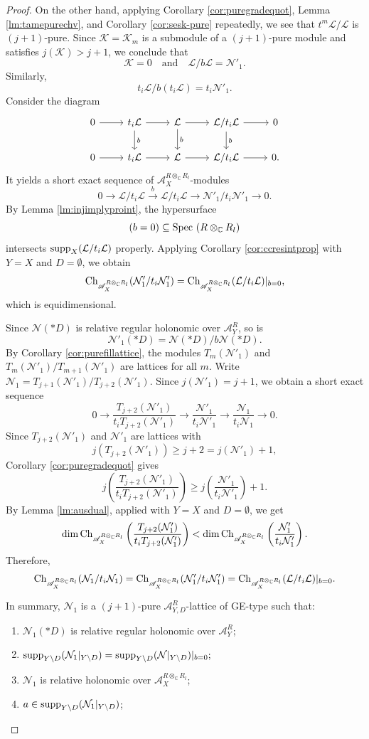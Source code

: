 \documentclass{amsart}
\theoremstyle{plain}
\numberwithin{theorem}{section}
\theoremstyle{definition}
\theoremstyle{remark}
\theoremstyle{definition}
\newcommand{\C}{\mathbb{C}} %
\newcommand{\cK}{\mathcal{K}}
\newcommand{\cL}{\mathcal{L}}
\newcommand{\cN}{\mathcal{N}}
\newcommand{\sA}{\mathscr{A}}
\newcommand{\Spec}{\textup{Spec }}
\newcommand{\supp}{\textup{supp}}
\newcommand{\Ch}{\textup{Ch}}
\begin{document}
\begin{proof}
On the other hand, applying Corollary \ref{cor:puregradequot}, Lemma \ref{lm:tamepurechv}, and Corollary \ref{cor:sesk-pure} repeatedly, we see that $t^m\cL/\cL$ is $(j+1)$-pure. Since $\cK=\cK_m$ is a submodule of a $(j+1)$-pure module and satisfies $j(\cK)>j+1$, we conclude that
\[
\cK=0
\quad \text{and} \quad
\cL/b\cL=\cN'_1.
\]
Similarly,
\[
t_i\cL/b(t_i\cL)=t_i\cN'_1.
\]
Consider the diagram
\[
\begin{tikzcd}
0\arrow[r]&
t_i\cL\arrow[r]\arrow[d,"b"]&
\cL\arrow[r]\arrow[d,"b"]&
{\cL}/{t_i\cL}\arrow[r]\arrow[d,"b"]&
0\\
0\arrow[r]&
t_i\cL\arrow[r]&
\cL\arrow[r]&
{\cL}/{t_i\cL}\arrow[r]&
0.
\end{tikzcd}
\]
It yields a short exact sequence of $\sA_X^{R\otimes_\C R_l}$-modules
\[
0\to
{\cL}/{t_i\cL}
\xrightarrow{b}
{\cL}/{t_i\cL}
\to
\cN'_1/t_i\cN'_1
\to0.
\]
By Lemma \ref{lm:injimplyproint}, the hypersurface
\[
(b=0)\subseteq \Spec(R\otimes_\C R_l)
\]
intersects $\supp_X(\cL/t_i\cL)$ properly. Applying Corollary \ref{cor:ccresintprop} with $Y=X$ and $D=\emptyset$, we obtain
\[
\Ch_{\sA_X^{R\otimes_\C R_l}}(\cN'_1/t_i\cN'_1)
=
\Ch_{\sA_X^{R\otimes_\C R_l}}(\cL/t_i\cL)|_{b=0},
\]
which is equidimensional.

Since $\cN(*D)$ is relative regular holonomic over $\sA_Y^R$, so is
\[
\cN'_1(*D)=\cN(*D)/b\cN(*D).
\]
By Corollary \ref{cor:purefillattice}, the modules $T_m(\cN'_1)$ and
$T_m(\cN'_1)/T_{m+1}(\cN'_1)$
are lattices for all $m$. Write
$\cN_1=T_{j+1}(\cN'_1)/T_{j+2}(\cN'_1).$
Since $j(\cN'_1)=j+1$, we obtain a short exact sequence
\[
0\to
\frac{T_{j+2}(\cN'_1)}{t_iT_{j+2}(\cN'_1)}
\longrightarrow
\frac{\cN'_1}{t_i\cN'_1}
\longrightarrow
\frac{\cN_1}{t_i\cN_1}
\to0.
\]
Since $T_{j+2}(\cN'_1)$ and $\cN'_1$ are lattices with
\[
j(T_{j+2}(\cN'_1))\ge j+2=j(\cN'_1)+1,
\]
Corollary \ref{cor:puregradequot} gives
\[
j\left(
\frac{T_{j+2}(\cN'_1)}{t_iT_{j+2}(\cN'_1)}
\right)
\ge
j\left(
\frac{\cN'_1}{t_i\cN'_1}
\right)+1.
\]
By Lemma \ref{lm:ausdual}, applied with $Y=X$ and $D=\emptyset$, we get
\[
\dim\Ch_{\sA_X^{R\otimes_\C R_l}}
\left(
\frac{T_{j+2}(\cN'_1)}{t_iT_{j+2}(\cN'_1)}
\right)
<
\dim\Ch_{\sA_X^{R\otimes_\C R_l}}
\left(
\frac{\cN'_1}{t_i\cN'_1}
\right).
\]
Therefore,
\[
\Ch_{\sA_X^{R\otimes_\C R_l}}(\cN_1/t_i\cN_1)
=
\Ch_{\sA_X^{R\otimes_\C R_l}}(\cN'_1/t_i\cN'_1)
=
\Ch_{\sA_X^{R\otimes_\C R_l}}(\cL/t_i\cL)|_{b=0}.
\]

In summary, $\cN_1$ is a $(j+1)$-pure $\sA^R_{Y,D}$-lattice of GE-type such that:
\begin{enumerate}[label=$(\arabic*)$]
    \item $\cN_1(*D)$ is relative regular holonomic over $\sA^R_Y$;
    \item
    $\supp_{Y\setminus D}(\cN_1|_{Y\setminus D})
    =
    \supp_{Y\setminus D}(\cN|_{Y\setminus D})|_{b=0};$
    \item $\cN_1$ is relative holonomic over $\sA_X^{R\otimes_\C R_l}$;
    \item
    $a\in \supp_{Y\setminus D}(\cN_1|_{Y\setminus D})$;


\end{enumerate}
\end{proof}
\end{document}
